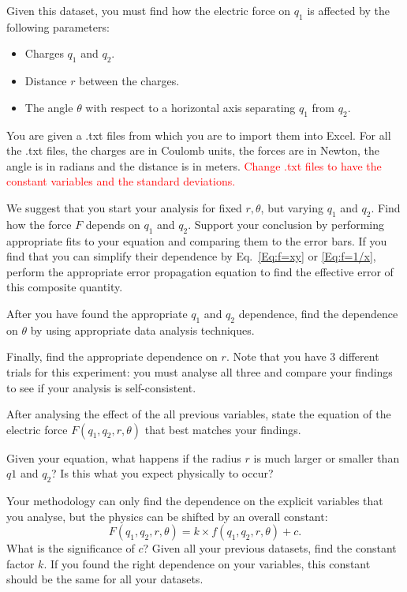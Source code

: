 \documentclass[12pt]{report}
\def \todo #1{\textcolor{red}{#1}}
\begin{document}
Given this dataset, you must find how the electric force on $q_1$ is affected by the following parameters:
\begin{itemize}
\item Charges $q_1$ and $q_2$.
\item Distance $r$ between the charges.
\item The angle $\theta$ with respect to a horizontal axis separating $q_1$ from $q_2$.
\end{itemize}

You are given a .txt files from which you are to import them into Excel. For all the .txt files, the charges are in Coulomb units, the forces are in Newton, the angle is in radians and the distance is in meters. \todo{Change .txt files to have the constant variables and the standard deviations.}

We suggest that you start your analysis for fixed $r, \theta$, but varying $q_1$ and $q_2$. Find how the force $F$ depends on $q_1$ and $q_2$. Support your conclusion by performing appropriate fits to your equation and comparing them to the error bars. If you find that you can simplify their dependence by Eq.~\eqref{Eq:f=xy} or \eqref{Eq:f=1/x}, perform the appropriate error propagation equation to find the effective error of this composite quantity.

After you have found the appropriate $q_1$ and $q_2$ dependence, find the dependence on $\theta$ by using appropriate data analysis techniques.

Finally, find the appropriate dependence on $r$. Note that you have 3 different trials for this experiment: you must analyse all three and compare your findings to see if your analysis is self-consistent.

After analysing the effect of the all previous variables, state the equation of the electric force $F(q_1,q_2,r,\theta)$ that best matches your findings. 

Given your equation, what happens if the radius $r$ is much larger or smaller than $q1$ and $q_2$? Is this what you expect physically to occur?

Your methodology can only find the dependence on the explicit variables that you analyse, but the physics can be shifted by an overall constant:
\begin{equation}
F(q_1, q_2, r, \theta) = k \times  f(q_1,q_2,r,\theta) +c.
\end{equation}
What is the significance of $c$? Given all your previous datasets, find the constant factor $k$. If you found the right dependence on your variables, this constant should be the same for all your datasets.
\end{document}
